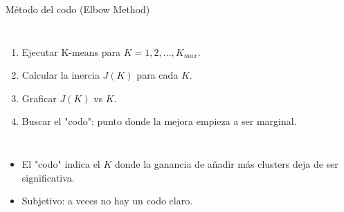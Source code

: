 \documentclass[aspectratio=169]{beamer}
\begin{document}
\begin{frame}{Método del codo (Elbow Method)}
    \begin{columns}
        \begin{enumerate}
            \item Ejecutar K-means para \(K = 1, 2, \ldots, K_{max}\).
            \item Calcular la inercia \(J(K)\) para cada \(K\).
            \item Graficar \(J(K)\) vs \(K\).
            \item Buscar el "codo": punto donde la mejora empieza a ser marginal.
        \end{enumerate}
        
    \end{columns}
    
    \begin{itemize}
        \item El "codo" indica el \(K\) donde la ganancia de añadir más clusters deja de ser significativa.
        \item Subjetivo: a veces no hay un codo claro.
    \end{itemize}
\end{frame}
\end{document}
